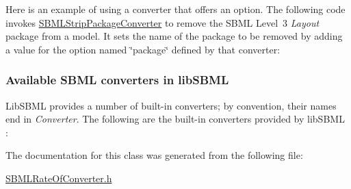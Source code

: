 Here is an example of using a converter that offers an option. The following code invokes \hyperlink{class_s_b_m_l_strip_package_converter}{S\+B\+M\+L\+Strip\+Package\+Converter} to remove the S\+B\+ML Level~3 {\itshape Layout} package from a model. It sets the name of the package to be removed by adding a value for the option named {\ttfamily \char`\"{}package\char`\"{}} defined by that converter\+:\hypertarget{classdoc__section__using__sbml__converters_available-converters}{}\subsubsection{Available S\+B\+M\+L converters in lib\+S\+B\+ML}\label{classdoc__section__using__sbml__converters_available-converters}
Lib\+S\+B\+ML provides a number of built-\/in converters; by convention, their names end in {\itshape Converter}. The following are the built-\/in converters provided by lib\+S\+B\+ML \+:

The documentation for this class was generated from the following file\+:\begin{DoxyCompactItemize}
\item 
\hyperlink{_s_b_m_l_rate_of_converter_8h}{S\+B\+M\+L\+Rate\+Of\+Converter.\+h}\end{DoxyCompactItemize}

